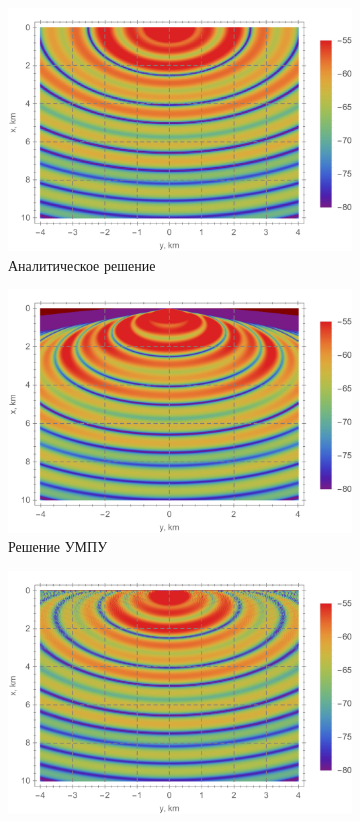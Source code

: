 \documentclass{fefu}
\begin{document}
                \begin{figure}[h]
                    \centering
                    \begin{subfigure}[t]{\linewidth}
                        \centering
                        \includegraphics[width=0.49\linewidth]{pekeris_analytical}
                        \caption{Аналитическое решение}
                    \end{subfigure}
                    \begin{subfigure}[t]{0.49\linewidth}
                        \centering
                        \includegraphics[width=\linewidth]{pekeris_nampe}
                        \caption{Решение УМПУ}
                    \end{subfigure}
                    \begin{subfigure}[t]{0.49\linewidth}
                        \centering
                        \includegraphics[width=\linewidth]{pekeris_wampe}

\end{subfigure}
\end{figure}
\end{document}
